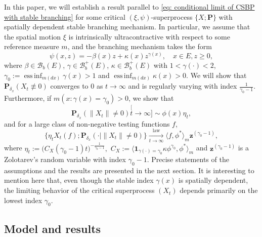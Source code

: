 \documentclass[12pt, a4paper]{amsart}
\theoremstyle{definition}
\numberwithin{equation}{section}
\begin{document}
In this paper, we will establish a result parallel
	to \eqref{eq: conditional limit of CSBP with stable branching} for some
   critical $(\xi,\psi)$-superprocess $\{X; \mathbf P\}$
	with spatially dependent stable branching mechanism.
	In particular, we assume that the spatial motion $\xi$ is intrinsically ultracontractive with respect to some reference measure $m$, and the branching mechanism takes the form
\[
	\psi(x,z) = -\beta (x) z + \kappa(x) z^{\gamma(x)},
	\quad x\in E, z \geq 0,
\]
	where $\beta \in \mathscr B_b(E)$, $\gamma \in \mathscr B^+_b(E)$, $\kappa \in \mathscr B^+_b(E)$ with $1< \gamma(\cdot )<2$, $\gamma_0 := \operatorname{ess\,inf}_{m(dx)} \gamma(x)> 1$ and $\operatorname{ess\,inf}_{m(dx)}\kappa(x) > 0$.
	We will show that $\mathbf P_{\delta_x}( X_t \not \equiv 0) $ converges to $0$ as $t\to \infty$ and
	is regularly varying with index $\frac{1}{\gamma_0 - 1}$.
	Furthermore, if $m(x: \gamma(x) = \gamma_0)>0$, we show that
\[
	\mathbf P_{\delta_x}( \|X_t\| \neq0)
	\stackrel[t\to \infty]{}{\sim} \phi(x) \eta_t,
\]
	and for a large class of non-negative testing functions $f$,
\[\label{eq: result2}
	\{   \eta_t X_t(f) ; \mathbf P_{\delta_x}(\cdot | \|X_t\|\neq 0) \}
	\xrightarrow[t\to \infty]{\operatorname{law}}
	\langle f, \phi^*\rangle_m \mathbf z^{(\gamma_0 - 1)},
\]
	where $\eta_t := \big( C_X(\gamma_0 - 1) t \big)^{- \frac {1} {\gamma_0 - 1} },$ $C_X := \langle \mathbf 1_{\gamma(\cdot) = \gamma_0} \kappa \phi^{\gamma_0}, \phi^* \rangle_m$ and $\mathbf z^{(\gamma_0 - 1)}$ is a Zolotarev's random variable with index $\gamma_0 - 1$.
	Precise statements of the assumptions and the results are presented in the next
		section.
    It is interesting to mention here that, even though the stable index $\gamma(x)$ is spatially dependent, the limiting behavior of the critical superprocess $(X_t)$   depends primarily on the lowest index $\gamma_0$.
	
\subsection{Model and results}
\end{document}
